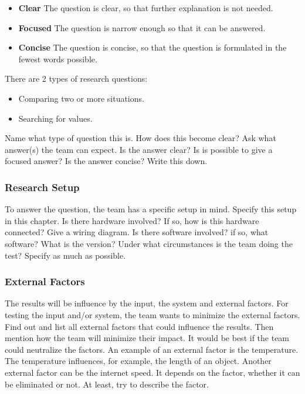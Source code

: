 \documentclass[10pt]{report}
\begin{document}
\begin{itemize}
	\item \textbf{Clear} The question is clear, so that further explanation is not needed.
	\item \textbf{Focused} The question is narrow enough so that it can be answered.
	\item \textbf{Concise} The question is concise, so that the question is formulated in the fewest words possible.
\end{itemize}

There are 2 types of research questions:

\begin{itemize}
	\item Comparing two or more situations.
	\item Searching for values.
\end{itemize}

Name what type of question this is. How does this become clear? Ask what answer(s) the team can expect. Is the answer clear? Is is possible to give a focused answer? Is the answer concise? Write this down.

\subsubsection{Research Setup}

To answer the question, the team has a specific setup in mind. Specify this setup in this chapter. Is there hardware involved? If so, how is this hardware connected? Give a wiring diagram. Is there software involved? if so, what software? What is the version? Under what circumstances is the team doing the test? Specify as much as possible.

\subsubsection{External Factors}

The results will be influence by the input, the system and external factors. For testing the input and/or system, the team wants to minimize the external factors. Find out and list all external factors that could influence the results. Then mention how the team will minimize their impact. It would be best if the team could neutralize the factors. An example of an external factor is the temperature. The temperature influences, for example, the length of an object. Another external factor can be the internet speed. It depends on the factor, whether it can be eliminated or not. At least, try to describe the factor.
\end{document}
